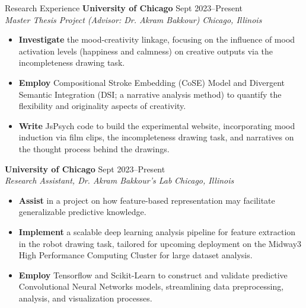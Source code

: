 \documentclass{resume} %
\begin{document}
\begin{rSection}{Research Experience}
\textbf{University of Chicago} \hfill{Sept 2023--Present} \\
\textit{Master Thesis Project (Advisor: Dr. Akram Bakkour)} \hfill{\textit{Chicago, Illinois}}
 \begin{itemize}
    \itemsep -5pt {} 
     \item \textbf{Investigate} the mood-creativity linkage, focusing on the influence of mood activation levels (happiness and calmness) on creative outputs via the incompleteness drawing task.
     \item \textbf{Employ} Compositional Stroke Embedding (CoSE) Model and Divergent Semantic Integration (DSI; a narrative analysis method) to quantify the flexibility and originality aspects of creativity.
     \item \textbf{Write} JsPsych code to build the experimental website, incorporating mood induction via film clips, the incompleteness drawing task, and narratives on the thought process behind the drawings.
 \end{itemize}

\textbf{University of Chicago} \hfill{Sept 2023--Present} \\
\textit{Research Assistant, Dr. Akram Bakkour’s Lab} \hfill{\textit{Chicago, Illinois}}
 \begin{itemize}
    \itemsep -5pt {} 
     \item \textbf{Assist} in a project on how feature-based representation may facilitate generalizable predictive knowledge.
     \item \textbf{Implement} a scalable deep learning analysis pipeline for feature extraction in the robot drawing task, tailored for upcoming deployment on the Midway3 High Performance Computing Cluster for large dataset analysis.
     \item \textbf{Employ} Tensorflow and Scikit-Learn to construct and validate predictive Convolutional Neural Networks models, streamlining data preprocessing, analysis, and visualization processes.
 \end{itemize}


\end{rSection}
\end{document}
